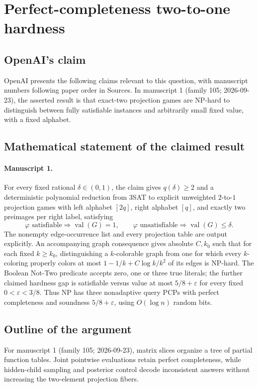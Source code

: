 \documentclass[11pt]{article}
\begin{document}
\section*{Perfect-completeness two-to-one hardness}

\subsection{OpenAI's claim}
OpenAI presents the following claims relevant to this question, with manuscript numbers following paper order in Sources. In manuscript 1 (family 105; 2026-09-23), the asserted result is that exact-two projection games are NP-hard to distinguish between fully satisfiable instances and arbitrarily small fixed value, with a fixed alphabet.

\subsection{Mathematical statement of the claimed result}
\paragraph{Manuscript 1.}
For every fixed rational $\delta\in(0,1)$, the claim gives $q(\delta)\ge2$ and a deterministic polynomial reduction from $3$SAT to explicit unweighted $2$-to-$1$ projection games with left alphabet $[2q]$, right alphabet $[q]$, and exactly two preimages per right label, satisfying
\[
 \varphi\text{ satisfiable}\Rightarrow\operatorname{val}(G)=1,
 \qquad\varphi\text{ unsatisfiable}\Rightarrow\operatorname{val}(G)\le\delta.
\]
The nonempty edge-occurrence list and every projection table are output explicitly. An accompanying graph consequence gives absolute $C,k_0$ such that for each fixed $k\ge k_0$, distinguishing a $k$-colorable graph from one for which every $k$-coloring properly colors at most $1-1/k+C\log k/k^2$ of its edges is NP-hard. The Boolean Not-Two predicate accepts zero, one or three true literals; the further claimed hardness gap is satisfiable versus value at most $5/8+\varepsilon$ for every fixed $0<\varepsilon<3/8$. Thus NP has three nonadaptive query PCPs with perfect completeness and soundness $5/8+\varepsilon$, using $O(\log n)$ random bits.

\subsection{Outline of the argument}
For manuscript 1 (family 105; 2026-09-23), matrix slices organize a tree of partial function tables. Joint pointwise evaluations retain perfect completeness, while hidden-child sampling and posterior control decode inconsistent answers without increasing the two-element projection fibers.
\end{document}
